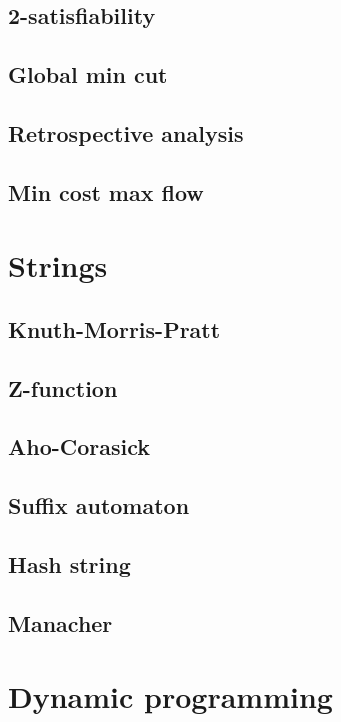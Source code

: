 \documentclass[10pt]{article}
\begin{document}
\subsection{2-satisfiability}

\subsection{Global min cut}

\subsection{Retrospective analysis}

\subsection{Min cost max flow}


\section{Strings}
\subsection{Knuth-Morris-Pratt}

\subsection{Z-function}

\subsection{Aho-Corasick}

\subsection{Suffix automaton}

\subsection{Hash string}

\subsection{Manacher}


\section{Dynamic programming}
\end{document}
